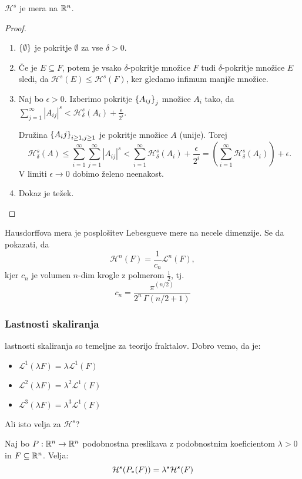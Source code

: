 \begin{trditev}
    \(\mathcal{H}^s\) je mera na \(\mathbb{R}^n\).
\end{trditev}
\begin{proof}
    \ 
    \begin{enumerate}
        \item \(\left\{\emptyset\right\}\) je pokritje \(\emptyset\) za vse \(\delta > 0\).
        \item Če je \(E \subseteq F\), potem je vsako \(\delta\)-pokritje množice \(F\) tudi \(\delta\)-pokritje množice \(E\) sledi, da \(\mathcal{H}^s(E) \leq \mathcal{H}^s(F)\), ker gledamo infimum manjše množice.
        \item Naj bo \(\epsilon > 0\). Izberimo pokritje \(\left\{A_{ij}\right\}_j\) množice \(A_i\) tako, da \(\sum_{j=1}^{\infty} |A_{ij}|^s < \mathcal{H}^s_\delta(A_i) + \frac{\epsilon}{2^i}\). 
        
        Družina \(\left\{A_ij\right\}_{i \geq 1, j \geq 1}\) je pokritje množice \(A\) (unije). Torej 
        \[\mathcal{H}^s_\delta(A) \leq \sum_{i=1}^{\infty} \sum_{j=1}^{\infty} |A_{ij}|^s < \sum_{i=1}^{\infty} \mathcal{H}^s_\delta (A_i) + \frac{\epsilon}{2^i} = \left(\sum_{i=1}^{\infty} \mathcal{H}^s_\delta (A_i)\right) + \epsilon.\]
        V limiti \(\epsilon \to 0\) dobimo želeno neenakost. 
        \item Dokaz je težek. \qedhere
    \end{enumerate}
\end{proof}

\begin{opomba}
    Hausdorffova mera je posplošitev Lebesgueve mere na necele dimenzije. Se da pokazati, da 
    \[\mathcal{H}^n(F) = \frac{1}{c_n} \mathcal{L}^n(F),\]
    kjer \(c_n\) je volumen \(n\)-dim krogle z polmerom \(\frac{1}{2}\), tj. 
    \[c_n = \frac{\pi^{(n/2)}}{2^n \, \Gamma(n/2 + 1)}\]
\end{opomba}

\subsubsection*{Lastnosti skaliranja}
lastnosti skaliranja so temeljne za teorijo fraktalov.
Dobro vemo, da je:
\begin{itemize}
    \item \(\mathcal{L}^1(\lambda F) = \lambda \mathcal{L}^1(F)\)
    \item \(\mathcal{L}^2(\lambda F) = \lambda^2 \mathcal{L}^1(F)\)
    \item \(\mathcal{L}^3(\lambda F) = \lambda^3 \mathcal{L}^1(F)\)
\end{itemize}
Ali isto velja za \(\mathcal{H}^s\)?
\begin{trditev}
    Naj bo \(P: \mathbb{R}^n \to \mathbb{R}^n\) podobnostna preslikava z podobnostnim koeficientom \(\lambda > 0\) in \(F \subseteq \mathbb{R}^n\). Velja:
    \[\mathcal{H}^s(P_{*}(F)) = \lambda^s \mathcal{H}^s(F)\]
\end{trditev}

